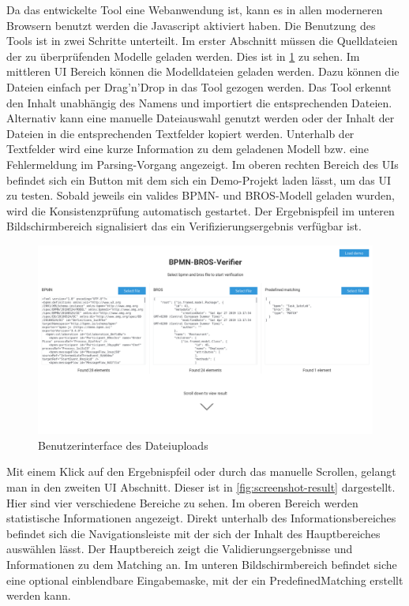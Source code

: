 Da das entwickelte Tool eine Webanwendung ist, kann es in allen moderneren Browsern benutzt werden die Javascript aktiviert haben.
Die Benutzung des Tools ist in zwei Schritte unterteilt.
Im erster Abschnitt müssen die Quelldateien der zu überprüfenden Modelle geladen werden.
Dies ist in \cref{fig:screenshot-upload} zu sehen.
Im mittleren UI Bereich können die Modelldateien geladen werden.
Dazu können die Dateien einfach per Drag'n'Drop in das Tool gezogen werden.
Das Tool erkennt den Inhalt unabhängig des Namens und importiert die entsprechenden Dateien.
Alternativ kann eine manuelle Dateiauswahl genutzt werden oder der Inhalt der Dateien in die entsprechenden Textfelder kopiert werden.
Unterhalb der Textfelder wird eine kurze Information zu dem geladenen Modell bzw. eine Fehlermeldung im Parsing-Vorgang angezeigt.
Im oberen rechten Bereich des UIs befindet sich ein Button mit dem sich ein Demo-Projekt laden lässt, um das UI zu testen.
Sobald jeweils ein valides BPMN- und BROS-Modell geladen wurden, wird die Konsistenzprüfung automatisch gestartet.
Der Ergebnispfeil im unteren Bildschirmbereich signalisiert das ein Verifizierungsergebnis verfügbar ist.


\begin{figure}
    \centering
    \includegraphics[width=\textwidth,keepaspectratio]{../images/Screenshot-Upload.png}%
    \caption{Benutzerinterface des Dateiuploads}%
    \label{fig:screenshot-upload}
\end{figure}

Mit einem Klick auf den Ergebnispfeil oder durch das manuelle Scrollen, gelangt man in den zweiten UI Abschnitt.
Dieser ist in \cref{fig:screenshot-result} dargestellt.
Hier sind vier verschiedene Bereiche zu sehen.
Im oberen Bereich werden statistische Informationen angezeigt.
Direkt unterhalb des Informationsbereiches befindet sich die Navigationsleiste mit der sich der Inhalt des Hauptbereiches auswählen lässt.
Der Hauptbereich zeigt die Validierungsergebnisse und Informationen zu dem Matching an.
Im unteren Bildschirmbereich befindet siche eine optional einblendbare Eingabemaske, mit der ein PredefinedMatching erstellt werden kann.

